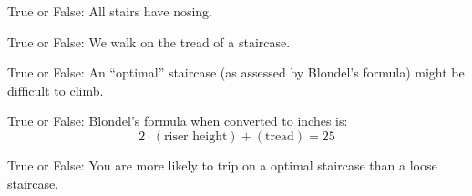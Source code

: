 \documentclass[noauthor,nooutcomes,12pt]{ximera}
\author{Claire Merriman and Bart Snapp}
\begin{document}
\maketitle



\begin{exercise}
  True or False: All stairs have nosing.
\end{exercise}


\begin{exercise}
   True or False: We walk on the tread of a staircase.
\end{exercise}


\begin{exercise} True or False: 
  An ``optimal'' staircase (as assessed by Blondel's formula) might be difficult to climb.
\end{exercise}

\begin{exercise} True or False: 
  Blondel's formula when converted to inches is:
  \[
  2\cdot (\text{riser height}) + (\text{tread})=25 
  \]
\end{exercise}

\begin{exercise} True or False: 
  You are more likely to trip on a optimal staircase than a loose
  staircase.
\end{exercise}

\end{document}
